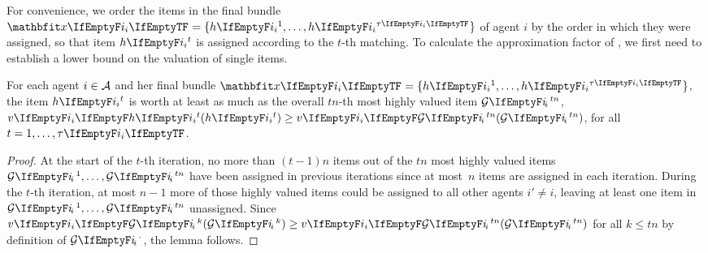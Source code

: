 For convenience, we order the items in the final bundle \(\alloc = \{\asgd{1}, \dots, \asgd{\alloclen}\}\) of agent \(i\) by the order in which they were assigned, so that item \(\asgd{t}\) is assigned according to the \(t\)-th matching.
To calculate the approximation factor of \SMatch, we first need to establish a lower bound on the valuation of single items.
\begin{lemma}
	\label{lem:lower_bound_single_item}
	For each agent \(i \in \mathcal{A}\) and her final bundle \(\alloc = \{\asgd{1}, \dots, \asgd{\alloclen}\}\), the item \(\asgd{t}\) is worth at least as much as the overall \(tn\)-th most highly valued item \(\goodsordered{tn}\), \ie{} \(\valuations[\asgd{t}] \geq \valuations[\goodsordered{tn}]\), for all \(t = 1, \dots, \alloclen\).
\end{lemma}
\begin{proof}
	At the start of the \(t\)-th iteration, no more than \((t-1) n\) items out of the \(tn\) most highly valued items \(\goodsordered{1}, \dots, \goodsordered{tn}\) have been assigned in previous iterations since at most~\(n\) items are assigned in each iteration.
	During the \(t\)-th iteration, at most \(n-1\) more of those highly valued items could be assigned to all other agents \(i' \neq i\), leaving at least one item in \(\goodsordered{1}, \dots, \goodsordered{tn}\) unassigned.
	Since \(\valuations[\goodsordered{k}] \geq \valuations[\goodsordered{tn}]\) for all \(k \leq tn\) by definition of \(\goodsordered{\cdot}\), the lemma follows.
\end{proof}

